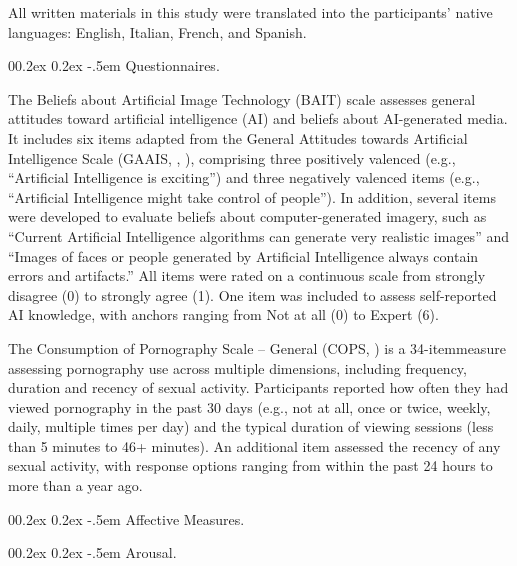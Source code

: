 \documentclass[
  jou,
  floatsintext,
  longtable,
  nolmodern,
  notxfonts,
  notimes,
  colorlinks=true,linkcolor=blue,citecolor=blue,urlcolor=blue]{apa7}
\makeatletter
\renewcommand{\paragraph}{\@startsection{paragraph}{4}{\parindent}%
	{0\baselineskip \@plus 0.2ex \@minus 0.2ex}%
	{-.5em}%
	{\normalfont\normalsize\bfseries\typesectitle}}
\makeatother
\begin{document}
All written materials in this study were translated into the
participants' native languages: English, Italian, French, and Spanish.

\paragraph{Questionnaires.}\label{questionnaires}

The Beliefs about Artificial Image Technology (BAIT) scale assesses
general attitudes toward artificial intelligence (AI) and beliefs about
AI-generated media. It includes six items adapted from the General
Attitudes towards Artificial Intelligence Scale (GAAIS,
,
), comprising three positively
valenced (e.g., ``Artificial Intelligence is exciting'') and three
negatively valenced items (e.g., ``Artificial Intelligence might take
control of people''). In addition, several items were developed to
evaluate beliefs about computer-generated imagery, such as ``Current
Artificial Intelligence algorithms can generate very realistic images''
and ``Images of faces or people generated by Artificial Intelligence
always contain errors and artifacts.'' All items were rated on a
continuous scale from strongly disagree (0) to strongly agree (1). One
item was included to assess self-reported AI knowledge, with anchors
ranging from Not at all (0) to Expert (6).

The Consumption of Pornography Scale -- General (COPS,
) is a
34-itemmeasure assessing pornography use across multiple dimensions,
including frequency, duration and recency of sexual activity.
Participants reported how often they had viewed pornography in the past
30 days (e.g., not at all, once or twice, weekly, daily, multiple times
per day) and the typical duration of viewing sessions (less than 5
minutes to 46+ minutes). An additional item assessed the recency of any
sexual activity, with response options ranging from within the past 24
hours to more than a year ago.

\paragraph{Affective Measures.}\label{affective-measures}

\paragraph{Arousal.}\label{arousal}
\end{document}
